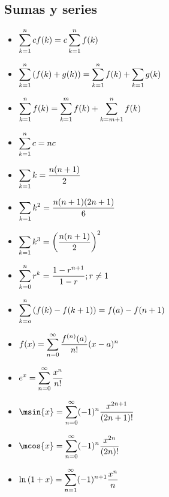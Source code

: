 \subsection{Sumas y series}
\begin{itemize}
	\item $\displaystyle\sum_{k = 1}^{n}cf(k) = c\sum_{k = 1}^{n}f(k)$
	\item $\displaystyle\sum_{k = 1}^{n}\left( f(k) + g(k) \right) =\sum_{k = 1}^{n}f(k) +\sum_{k = 1}g(k)$
	\item $\displaystyle\sum_{k = 1}^{n}f(k) =\sum_{k = 1}^{m}f(k) +\sum_{k = m + 1}^{n}f(k)$
	\item $\displaystyle\sum_{k = 1}^{n}c =nc$
	\item $\displaystyle\sum_{k = 1}k =\dfrac{n(n + 1)}{2}$
	\item $\displaystyle\sum_{k = 1}k^{2} =\dfrac{n(n + 1)(2n + 1)}{6}$
	\item $\displaystyle\sum_{k = 1}k^{3} =\left( \dfrac{n(n + 1)}{2} \right)^{2}$
	\item $\displaystyle\sum_{k = 0}^{n}r^{k} =\dfrac{1 - r^{n + 1}}{1 - r} ; r\neq 1$
	\item $\displaystyle\sum_{k = a}^{n}\left( f(k) - f(k + 1) \right) = f(a) - f(n + 1)$
	\item $\displaystyle f(x) =\sum_{n = 0}^{\infty}\dfrac{f^{(n)}(a)}{n!}(x - a)^{n}$
	\item $\displaystyle e^{x} =\sum_{n = 0}^{\infty}\dfrac{x^{n}}{n!}$
	\item $\ds\msin{x} =\sum_{n = 0}^{\infty}(-1)^{n}\dfrac{x^{2n + 1}}{(2n + 1)!}$
	\item $\ds\mcos{x} =\sum_{n = 0}^{\infty}(-1)^{n}\dfrac{x^{2n}}{(2n)!}$
	\item $\ds\mln{1 + x} =\sum_{n = 1}^{\infty}(-1)^{n + 1}\dfrac{x^{n}}{n}$
\end{itemize}
